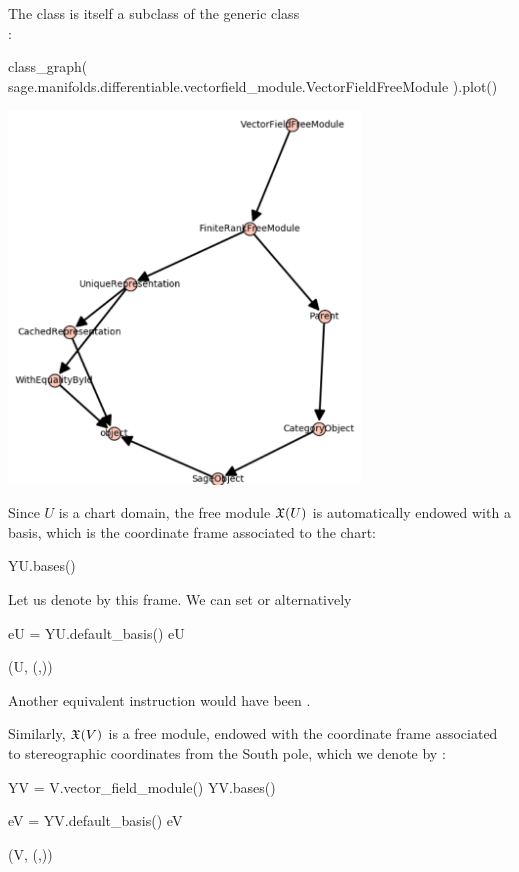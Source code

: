 The class  is itself a subclass
of the generic class\\ :
\begin{NBin}
class_graph(
  sage.manifolds.differentiable.vectorfield_module.VectorFieldFreeModule
).plot()
\end{NBin}
\begin{center}
\includegraphics[width=0.7\textwidth]{vfmodule_class.png}
\end{center}

Since $U$ is a chart domain, the free module $\mathfrak{X}(U)$ is automatically endowed with a basis,
which is the coordinate frame associated to the chart:
\begin{NBin}
YU.bases()
\end{NBin}
\begin{NBoutM}
\end{NBoutM}
Let us denote by  this frame. We can set  or
alternatively
\begin{NBin}
eU = YU.default_basis()
eU
\end{NBin}
\begin{NBoutM}
\left(U, \left(,\right)\right)
\end{NBoutM}
Another equivalent instruction would have been .

Similarly, $\mathfrak{X}(V)$ is a free module, endowed with the coordinate frame
associated to stereographic coordinates from the South pole, which we
denote by :
\begin{NBin}
YV = V.vector_field_module()
YV.bases()
\end{NBin}
\begin{NBoutM}
\end{NBoutM}
\begin{NBin}
eV = YV.default_basis()
eV
\end{NBin}
\begin{NBoutM}
\left(V, \left(,\right)\right)
\end{NBoutM}

